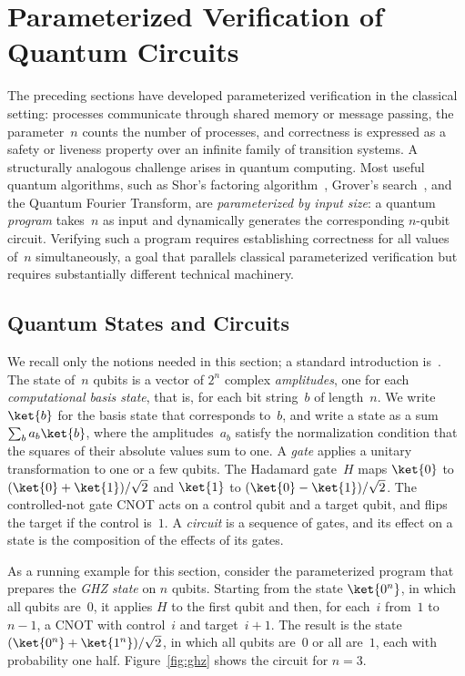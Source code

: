 \section{Parameterized Verification of Quantum Circuits}
\label{sec:quantum}

The preceding sections have developed parameterized verification in the
classical setting: processes communicate through shared memory or message
passing, the parameter~$n$ counts the number of processes, and correctness
is expressed as a safety or liveness property over an infinite family of
transition systems. A structurally analogous challenge arises in quantum
computing. Most useful quantum algorithms, such as Shor's factoring
algorithm~\cite{Sho97}, Grover's search~\cite{Gro96}, and the Quantum Fourier
Transform, are \emph{parameterized by input size}: a quantum \emph{program}
takes~$n$ as input and dynamically generates the corresponding $n$-qubit
circuit. Verifying such a program requires establishing correctness for all
values of~$n$ simultaneously, a goal that parallels classical parameterized
verification but requires substantially different technical machinery.

\subsection{Quantum States and Circuits}

We recall only the notions needed in this section; a standard introduction
is~\cite{NC10}. The state of~$n$ qubits is a vector of $2^n$ complex
\emph{amplitudes}, one for each \emph{computational basis state}, that is, for
each bit string~$b$ of length~$n$. We write $\ket{b}$ for the basis state that
corresponds to~$b$, and write a state as a sum $\sum_b a_b \ket{b}$, where the
amplitudes~$a_b$ satisfy the normalization condition that the squares of their
absolute values sum to one. A \emph{gate} applies a unitary transformation to
one or a few qubits. The Hadamard gate~$H$ maps $\ket{0}$ to $(\ket{0} +
\ket{1})/\sqrt{2}$ and $\ket{1}$ to $(\ket{0} - \ket{1})/\sqrt{2}$. The
controlled-not gate CNOT acts on a control qubit and a target qubit, and
flips the target if the control is~$1$. A \emph{circuit} is a sequence of
gates, and its effect on a state is the composition of the effects of its
gates.

As a running example for this section, consider the parameterized program
that prepares the \emph{GHZ state} on $n$ qubits. Starting from the state
$\ket{0^n}$, in which all qubits are~$0$, it applies $H$ to the first qubit
and then, for each~$i$ from~$1$ to~$n-1$, a CNOT with control~$i$ and
target~$i+1$. The result is the state $(\ket{0^n} + \ket{1^n})/\sqrt{2}$, in
which all qubits are~$0$ or all are~$1$, each with probability one half.
Figure~\ref{fig:ghz} shows the circuit for $n = 3$.

